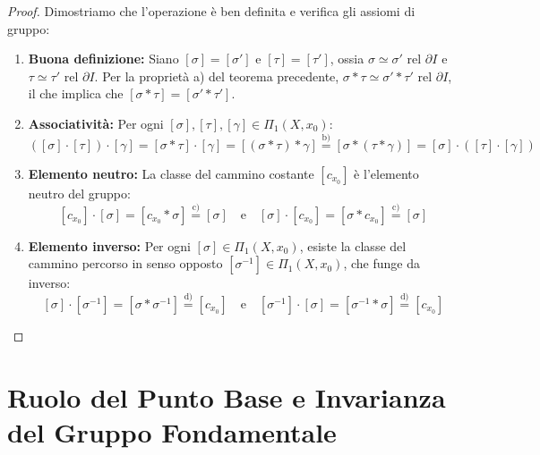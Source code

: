 \begin{proof}
Dimostriamo che l'operazione è ben definita e verifica gli assiomi di gruppo:
\begin{enumerate}
    \item \textbf{Buona definizione:} Siano $[\sigma] = [\sigma']$ e $[\tau] = [\tau']$, ossia $\sigma \simeq \sigma' \text{ rel } \partial I$ e $\tau \simeq \tau' \text{ rel } \partial I$. Per la proprietà a) del teorema precedente, $\sigma * \tau \simeq \sigma' * \tau' \text{ rel } \partial I$, il che implica che $[\sigma * \tau] = [\sigma' * \tau']$.
    
    \item \textbf{Associatività:} Per ogni $[\sigma], [\tau], [\gamma] \in \Pi_1(X, x_0)$:
    \[
    ([\sigma] \cdot [\tau]) \cdot [\gamma] = [\sigma * \tau] \cdot [\gamma] = [(\sigma * \tau) * \gamma] \stackrel{\text{b)}}{=} [\sigma * (\tau * \gamma)] = [\sigma] \cdot ([\tau] \cdot [\gamma])
    \]
    
    \item \textbf{Elemento neutro:} La classe del cammino costante $[c_{x_0}]$ è l'elemento neutro del gruppo:
    \[
    [c_{x_0}] \cdot [\sigma] = [c_{x_0} * \sigma] \stackrel{\text{c)}}{=} [\sigma] \quad \text{e} \quad [\sigma] \cdot [c_{x_0}] = [\sigma * c_{x_0}] \stackrel{\text{c)}}{=} [\sigma]
    \]
    
    \item \textbf{Elemento inverso:} Per ogni $[\sigma] \in \Pi_1(X, x_0)$, esiste la classe del cammino percorso in senso opposto $[\sigma^{-1}] \in \Pi_1(X, x_0)$, che funge da inverso:
    \[
    [\sigma] \cdot [\sigma^{-1}] = [\sigma * \sigma^{-1}] \stackrel{\text{d)}}{=} [c_{x_0}] \quad \text{e} \quad [\sigma^{-1}] \cdot [\sigma] = [\sigma^{-1} * \sigma] \stackrel{\text{d)}}{=} [c_{x_0}]
    \]
\end{enumerate}
\end{proof}

\section{Ruolo del Punto Base e Invarianza del Gruppo Fondamentale}

